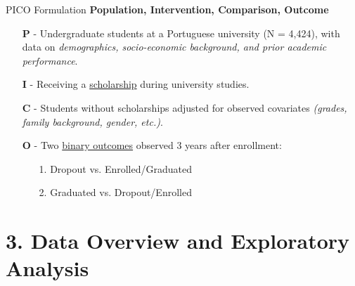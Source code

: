 \documentclass[aspectratio=169]{beamer}
\begin{document}
  \begin{frame}{PICO Formulation}
  \textbf{Population, Intervention, Comparison, Outcome}
  	\begin{itemize}
  		\item [\textbf{P} - ] Undergraduate students at a Portuguese university (N = 4,424), with data on \textit{demographics, socio-economic background, and prior academic performance}.
  		\item [\textbf{I} - ] Receiving a \underline{scholarship} during university studies.
  		\item [\textbf{C} - ] Students without scholarships adjusted for observed covariates \textit{(grades, family background, gender, etc.)}.
  		\item [\textbf{O} - ] Two \underline{binary outcomes} observed 3 years after enrollment:
  
  	\begin{itemize}
  		\item [1.] Dropout vs. Enrolled/Graduated
  		\item [2.] Graduated vs. Dropout/Enrolled
  	\end{itemize}
  	
  	\end{itemize}
  \end{frame}
  

\section{3. Data Overview and Exploratory Analysis}
\end{document}
